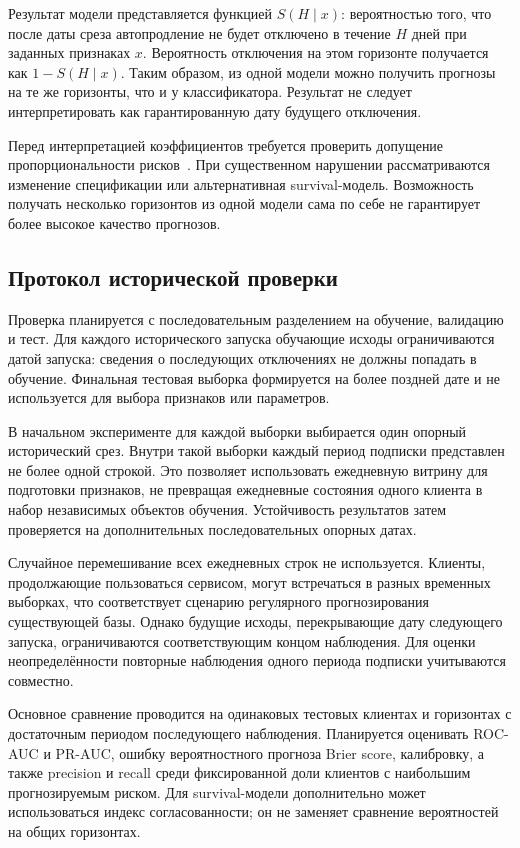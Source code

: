 \documentclass{misisarticle}
\begin{document}
Результат модели представляется функцией $S(H\mid x)$: вероятностью того, что после даты среза автопродление не будет отключено в течение $H$ дней при заданных признаках $x$. Вероятность отключения на этом горизонте получается как $1-S(H\mid x)$. Таким образом, из одной модели можно получить прогнозы на те же горизонты, что и у классификатора. Результат не следует интерпретировать как гарантированную дату будущего отключения.

Перед интерпретацией коэффициентов требуется проверить допущение пропорциональности рисков~\cite{kimitei2025}. При существенном нарушении рассматриваются изменение спецификации или альтернативная survival-модель. Возможность получать несколько горизонтов из одной модели сама по себе не гарантирует более высокое качество прогнозов.

\subsection{Протокол исторической проверки}

Проверка планируется с последовательным разделением на обучение, валидацию и тест. Для каждого исторического запуска обучающие исходы ограничиваются датой запуска: сведения о последующих отключениях не должны попадать в обучение. Финальная тестовая выборка формируется на более поздней дате и не используется для выбора признаков или параметров.

В начальном эксперименте для каждой выборки выбирается один опорный исторический срез. Внутри такой выборки каждый период подписки представлен не более одной строкой. Это позволяет использовать ежедневную витрину для подготовки признаков, не превращая ежедневные состояния одного клиента в набор независимых объектов обучения. Устойчивость результатов затем проверяется на дополнительных последовательных опорных датах.

Случайное перемешивание всех ежедневных строк не используется. Клиенты, продолжающие пользоваться сервисом, могут встречаться в разных временных выборках, что соответствует сценарию регулярного прогнозирования существующей базы. Однако будущие исходы, перекрывающие дату следующего запуска, ограничиваются соответствующим концом наблюдения. Для оценки неопределённости повторные наблюдения одного периода подписки учитываются совместно.

Основное сравнение проводится на одинаковых тестовых клиентах и горизонтах с достаточным периодом последующего наблюдения. Планируется оценивать ROC-AUC и PR-AUC, ошибку вероятностного прогноза Brier score, калибровку, а также precision и recall среди фиксированной доли клиентов с наибольшим прогнозируемым риском. Для survival-модели дополнительно может использоваться индекс согласованности; он не заменяет сравнение вероятностей на общих горизонтах.
\end{document}
